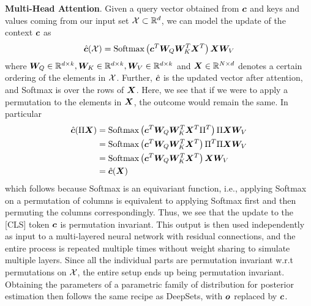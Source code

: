 \textbf{Multi-Head Attention}. Given a query vector obtained from ${\bm{c}}$ and keys and values coming from our input set ${\mathcal{X}} \subset \mathbb{R}^d$, we can model the update of the context ${\bm{c}}$ as
\begin{align}
    \hat{{\bm{c}}}({\mathcal{X}}) = \text{Softmax}\left({\bm{c}}^T {\bm{W}}_Q {\bm{W}}_K^T {\bm{X}}^T\right) {\bm{X}} {\bm{W}}_V
\end{align}
where ${\bm{W}}_Q \in \mathbb{R}^{d\times k}, {\bm{W}}_K \in \mathbb{R}^{d\times k}, {\bm{W}}_V \in \mathbb{R}^{d\times k}$ and ${\bm{X}} \in \mathbb{R}^{N\times d}$ denotes a certain ordering of the elements in ${\mathcal{X}}$. Further, $\hat{{\bm{c}}}$ is the updated vector after attention, and Softmax is over the rows of ${\bm{X}}$. Here, we see that if we were to apply a permutation to the elements in ${\bm{X}}$, the outcome would remain the same. In particular
\begin{align}
    \hat{{\bm{c}}}(\Pi {\bm{X}}) &= \text{Softmax}\left({\bm{c}}^T {\bm{W}}_Q {\bm{W}}_K^T {\bm{X}}^T \Pi^T\right) \Pi {\bm{X}} {\bm{W}}_V \\
    &= \text{Softmax}\left({\bm{c}}^T {\bm{W}}_Q {\bm{W}}_K^T {\bm{X}}^T\right) \Pi^T\Pi {\bm{X}} {\bm{W}}_V \\
    &= \text{Softmax}\left({\bm{c}}^T {\bm{W}}_Q {\bm{W}}_K^T {\bm{X}}^T\right) {\bm{X}} {\bm{W}}_V \\
    &= \hat{{\bm{c}}}({\bm{X}}) 
\end{align}
which follows because Softmax is an equivariant function,  i.e., applying Softmax on a permutation of columns is equivalent to applying Softmax first and then permuting the columns correspondingly. Thus, we see that the update to the [CLS] token ${\bm{c}}$ is permutation invariant. This output is then used independently as input to a multi-layered neural network with residual connections, and the entire process is repeated multiple times without weight sharing to simulate multiple layers. Since all the individual parts are permutation invariant w.r.t permutations on ${\mathcal{X}}$, the entire setup ends up being permutation invariant. Obtaining the parameters of a parametric family of distribution for posterior estimation then follows the same recipe as DeepSets, with ${\bm{o}}$ replaced by ${\bm{c}}$.
